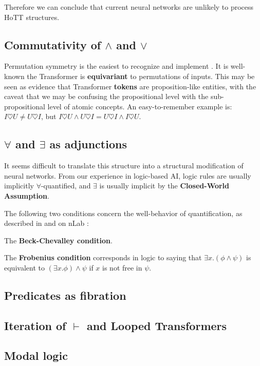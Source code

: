 \documentclass[runningheads]{llncs}
\begin{document}
Therefore we can conclude that current neural networks are unlikely to process HoTT structures.

\subsection{Commutativity of $\wedge$ and $\vee$}

Permutation symmetry is the easiest to recognize and implement \cite{Zaheer2017} \cite{Qi2017}.  It is well-known the Transformer is \textbf{equivariant} to permutations of inputs.  This may be seen as evidence that Transformer \textbf{tokens} are proposition-like entities, with the caveat that we may be confusing the propositional level with the sub-propositional level of atomic concepts.  An easy-to-remember example is: $I \heartsuit U \neq U \heartsuit I$, but $I \heartsuit U \wedge U \heartsuit I = U \heartsuit I \wedge I \heartsuit U$.

\subsection{$\forall$ and $\exists$ as adjunctions}

It seems difficult to translate this structure into a structural modification of neural networks.  From our experience in logic-based AI, logic rules are usually implicitly $\forall$-quantified, and $\exists$ is usually implicit by the \textbf{Closed-World Assumption}.

The following two conditions concern the well-behavior of quantification, as described in \cite{Jacobs1999} and on nLab \cite{nLab-beck-chevalley} \cite{nLab-Frobenius}:

\noindent The \textbf{Beck-Chevalley condition}.  

\noindent The \textbf{Frobenius condition} corresponds in logic to saying that $\exists x. (\phi \wedge \psi)$ is equivalent to $(\exists x. \phi) \wedge \psi$ if $x$ is not free in $\psi$.

\subsection{Predicates as fibration}

\subsection{Iteration of $\vdash$ and Looped Transformers}

\subsection{Modal logic}
\end{document}
